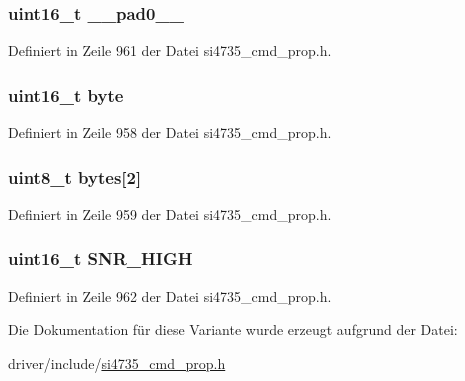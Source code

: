 \subsubsection[{\+\_\+\+\_\+pad0\+\_\+\+\_\+}]{\setlength{\rightskip}{0pt plus 5cm}uint16\+\_\+t \+\_\+\+\_\+pad0\+\_\+\+\_\+}\label{unionfm__hicut__snr__high__thres_a77132c2c26a75f5b8751b235cda23828}


Definiert in Zeile 961 der Datei si4735\+\_\+cmd\+\_\+prop.\+h.

\hypertarget{unionfm__hicut__snr__high__thres_ab0549c1b5ea980a02e7eab77e21fea49}{}
\subsubsection[{byte}]{\setlength{\rightskip}{0pt plus 5cm}uint16\+\_\+t byte}\label{unionfm__hicut__snr__high__thres_ab0549c1b5ea980a02e7eab77e21fea49}


Definiert in Zeile 958 der Datei si4735\+\_\+cmd\+\_\+prop.\+h.

\hypertarget{unionfm__hicut__snr__high__thres_a46e4c05d20a047ec169f60d3167e912e}{}
\subsubsection[{bytes}]{\setlength{\rightskip}{0pt plus 5cm}uint8\+\_\+t bytes\mbox{[}2\mbox{]}}\label{unionfm__hicut__snr__high__thres_a46e4c05d20a047ec169f60d3167e912e}


Definiert in Zeile 959 der Datei si4735\+\_\+cmd\+\_\+prop.\+h.

\hypertarget{unionfm__hicut__snr__high__thres_a58d28839dfa4529ecedf84fc6be5de83}{}
\subsubsection[{S\+N\+R\+\_\+\+H\+I\+G\+H}]{\setlength{\rightskip}{0pt plus 5cm}uint16\+\_\+t S\+N\+R\+\_\+\+H\+I\+G\+H}\label{unionfm__hicut__snr__high__thres_a58d28839dfa4529ecedf84fc6be5de83}


Definiert in Zeile 962 der Datei si4735\+\_\+cmd\+\_\+prop.\+h.



Die Dokumentation für diese Variante wurde erzeugt aufgrund der Datei\+:\begin{DoxyCompactItemize}
\item 
driver/include/\hyperlink{si4735__cmd__prop_8h}{si4735\+\_\+cmd\+\_\+prop.\+h}\end{DoxyCompactItemize}
